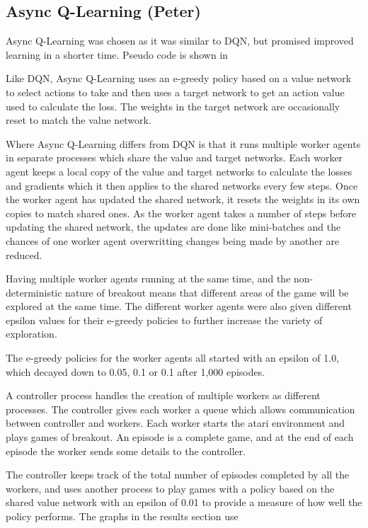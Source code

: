 \documentclass{article}
\begin{document}
\subsection{Async Q-Learning (Peter)}

Async Q-Learning was chosen as it was similar to DQN, but promised improved learning in a shorter time.
Pseudo code is shown in 

Like DQN, Async Q-Learning uses an e-greedy policy based on a value network to select actions to take and then uses a target network to get an action value used to calculate the loss.
The weights in the target network are occasionally reset to match the value network.

Where Async Q-Learning differs from DQN is that it runs multiple worker agents in separate processes which share the value and target networks.
Each worker agent keeps a local copy of the value and target networks to calculate the losses and gradients which it then applies to the shared networks every few steps.
Once the worker agent has updated the shared network, it resets the weights in its own copies to match shared ones.
As the worker agent takes a number of steps before updating the shared network, the updates are done like mini-batches and the chances of one worker agent overwritting changes being made by another are reduced.

Having multiple worker agents running at the same time, and the non-deterministic nature of breakout means that different areas of the game will be explored at the same time.
The different worker agents were also given different epsilon values for their e-greedy policies to further increase the variety of exploration.

The e-greedy policies for the worker agents all started with an epsilon of 1.0, which decayed down to 0.05, 0.1 or 0.1 after 1,000 episodes.

A controller process handles the creation of multiple workers as different processes.
The controller gives each worker a queue which allows communication between controller and workers.
Each worker starts the atari environment and plays games of breakout.
An episode is a complete game, and at the end of each episode the worker sends some details to the controller.

The controller keeps track of the total number of episodes completed by all the workers, and uses another process to play games with a policy based on the shared value network with an epsilon of 0.01 to provide a measure of how well the policy performs.
The graphs in the results section use
\end{document}
